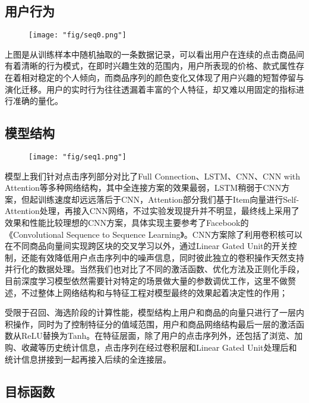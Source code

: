\subsection{用户行为}

\begin{figure}[!h]
	\centering
	\texttt{[image: "fig/seq0.png"]}
	\caption{}
	\label{fig:seq0}
\end{figure}
上图是从训练样本中随机抽取的一条数据记录，可以看出用户在连续的点击商品间有着清晰的行为模式，在即时兴趣生效的范围内，用户所表现的价格、款式属性存在着相对稳定的个人倾向，而商品序列的颜色变化又体现了用户兴趣的短暂停留与演化迁移。用户的实时行为往往透漏着丰富的个人特征，却又难以用固定的指标进行准确的量化。

\subsection{模型结构}
\begin{figure}[!h]
	\centering
	\texttt{[image: "fig/seq1.png"]}
	\caption{}
	\label{fig:seq1}
\end{figure}

模型上我们针对点击序列部分对比了Full Connection、LSTM、CNN、CNN with Attention等多种网络结构，其中全连接方案的效果最弱，LSTM稍弱于CNN方案，但起训练速度却远远落后于CNN，Attention部分我们基于Item向量进行Self-Attention处理，再接入CNN网络，不过实验发现提升并不明显，最终线上采用了效果和性能比较理想的CNN方案，具体实现主要参考了Facebook的《Convolutional Sequence to Sequence Learning》。CNN方案除了利用卷积核可以在不同商品向量间实现跨区块的交叉学习以外，通过Linear Gated Unit的开关控制，还能有效降低用户点击序列中的噪声信息，同时彼此独立的卷积操作天然支持并行化的数据处理。当然我们也对比了不同的激活函数、优化方法及正则化手段，目前深度学习模型依然需要针对特定的场景做大量的参数调优工作，这里不做赘述，不过整体上网络结构和与特征工程对模型最终的效果起着决定性的作用；

\par 受限于召回、海选阶段的计算性能，模型结构上用户和商品的向量只进行了一层内积操作，同时为了控制特征分的值域范围，用户和商品网络结构最后一层的激活函数从ReLU替换为Tanh。在特征层面，除了用户的点击序列外，还包括了浏览、加购、收藏等历史统计信息，点击序列在经过卷积层和Linear Gated Unit处理后和统计信息拼接到一起再接入后续的全连接层。


\subsection{目标函数}

